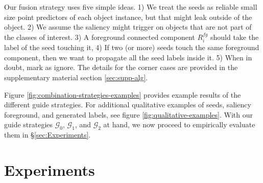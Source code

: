 \documentclass[british,10pt,twocolumn,letterpaper]{article}
\begin{document}
Our fusion strategy uses five simple ideas. 1) We treat the seeds
as reliable small size point predictors of each object instance, but
that might leak outside of the object. 2) We assume the saliency might
trigger on objects that are not part of the classes of interest. 3)
A foreground connected component $R_{i}^{fg}$ should take the label
of the seed touching it, 4) If two (or more) seeds touch the same
foreground component, then we want to propagate all the seed labels
inside it. 5) When in doubt, mark as ignore. The details for the corner
cases are provided in the supplementary material section \ref{sec:supp-alg}.

Figure \ref{fig:combination-strategies-examples} provides example
results of the different guide strategies. For additional qualitative
examples of seeds, saliency foreground, and generated labels, see
figure \ref{fig:qualitative-examples}. With our guide strategies
$\mathcal{G}_{0}$, $\mathcal{G}_{1}$, and $\mathcal{G}_{2}$ at
hand, we now proceed to empirically evaluate them in \S \ref{sec:Experiments}.

\section{\label{sec:Experiments}Experiments}
\end{document}
